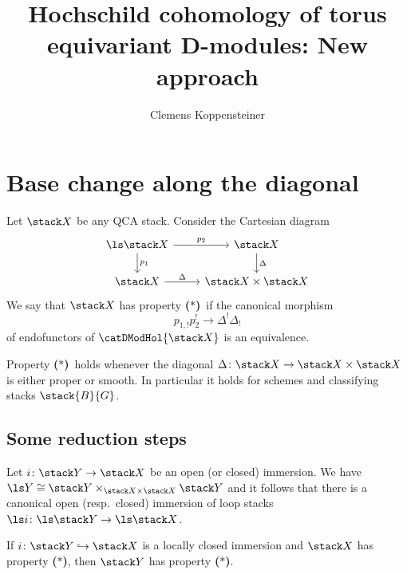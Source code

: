 \documentclass{ck-article}
\title{Hochschild cohomology of torus equivariant D-modules: New approach}
\author{Clemens Koppensteiner}
\newcommand\bc{\textbf{($\mathbf{*}$)}}
\newcommand\cs{\stack{B}}
\begin{document}
\maketitle

\section{Base change along the diagonal}

\begin{Def}
    Let $\stack X$ be any QCA stack.
    Consider the Cartesian diagram
    \[
        \begin{tikzcd}
            \ls \stack X \arrow[d, "p_1"] \arrow[r, "p_2"] & \stack X \arrow[d, "\Delta"] \\
            \stack X \arrow[r, "\Delta"] & \stack X \times \stack X
        \end{tikzcd}
    \]
    We say that $\stack X$ has property \bc\ if the canonical morphism
    \[
        p_{1,!}p_2^! \to \Delta^!\Delta_!
    \]
    of endofunctors of $\catDModHol{\stack X}$ is an equivalence.
\end{Def}

\begin{Lem}
    Property \bc\ holds whenever the diagonal $\Delta\colon \stack X \to \stack X \times \stack X$ is either proper or smooth.
    In particular it holds for schemes and classifying stacks $\cs{G}$.
\end{Lem}

\subsection{Some reduction steps}

Let $i\colon\stack Y \to \stack X$ be an open (or closed) immersion.
We have $\ls Y \cong \stack Y \times_{\stack X \times \stack X} \stack Y$ and it follows that there is a canonical open (resp.~closed) immersion of loop stacks $\ls i\colon \ls \stack Y \to \ls \stack X$.

\begin{Lem}\label{lem:bc_lc_immersion}
    If $i\colon\stack Y \hookrightarrow \stack X$ is a locally closed immersion and $\stack X$ has property \bc, then $\stack Y$ has property \bc.
\end{Lem}
\end{document}
